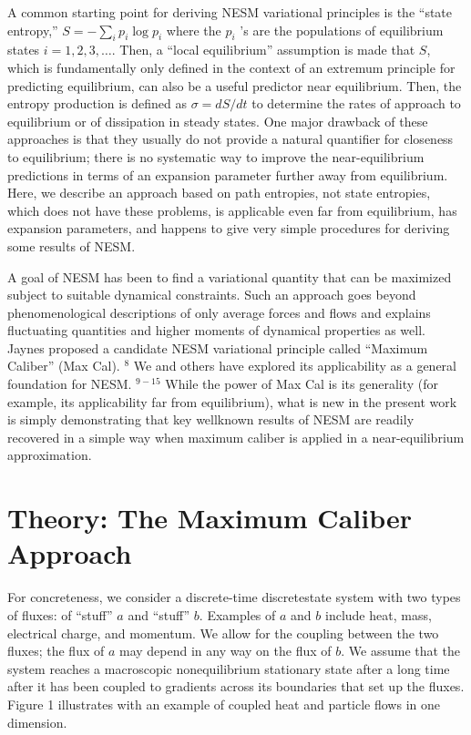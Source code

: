 \documentclass[aps,pra,twocolumn]{revtex4-1}
\begin{document}
A common starting point for deriving NESM variational principles is the ``state entropy,'' $S=-\sum_i p_i \log p_i$ where the $p_i$ 's are the populations of equilibrium states $i=1,2,3, \ldots$. Then, a ``local equilibrium'' assumption is made that $S$, which is fundamentally only defined in the context of an extremum principle for predicting equilibrium, can also be a useful predictor near equilibrium. Then, the entropy production is defined as $\sigma=d S / d t$ to determine the rates of approach to equilibrium or of dissipation in steady states. One major drawback of these approaches is that they usually do not provide a natural quantifier for closeness to equilibrium; there is no systematic way to improve the near-equilibrium predictions in terms of an expansion parameter further away from equilibrium. Here, we describe an approach based on path entropies, not state entropies, which does not have these problems, is applicable even far from equilibrium, has expansion parameters, and happens to give very simple procedures for deriving some results of NESM.

A goal of NESM has been to find a variational quantity that can be maximized subject to suitable dynamical constraints. Such an approach goes beyond phenomenological descriptions of only average forces and flows and explains fluctuating quantities and higher moments of dynamical properties as well. Jaynes proposed a candidate NESM variational principle called ``Maximum Caliber'' (Max Cal). ${ }^8$ We and others have explored its applicability as a general foundation for NESM. ${ }^{9-15}$ While the power of Max Cal is its generality (for example, its applicability far from equilibrium), what is new in the present work is simply demonstrating that key wellknown results of NESM are readily recovered in a simple way when maximum caliber is applied in a near-equilibrium approximation.

\section{Theory: The Maximum Caliber Approach}

For concreteness, we consider a discrete-time discretestate system with two types of fluxes: of ``stuff'' $a$ and ``stuff'' 
$b$. Examples of $a$ and $b$ include heat, mass, electrical charge, and momentum. We allow for the coupling between the two fluxes; the flux of $a$ may depend in any way on the flux of $b$. We assume that the system reaches a macroscopic nonequilibrium stationary state after a long time after it has been coupled to gradients across its boundaries that set up the fluxes. Figure 1 illustrates with an example of coupled heat and particle flows in one dimension.
\end{document}
